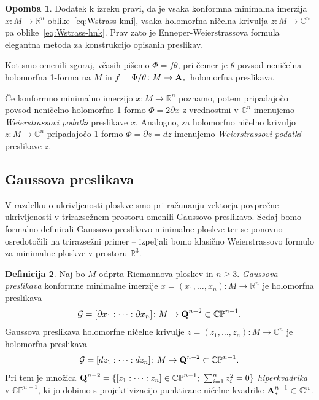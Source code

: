 \documentclass[12pt,a4paper,twoside]{article}
\theoremstyle{definition} %
\newtheorem{definicija}{Definicija}[section]
\newtheorem{opomba}[definicija]{Opomba}
\theoremstyle{plain} %
\numberwithin{equation}{section}  %
\newcommand{\R}{\mathbb R}
\newcommand{\C}{\mathbb C}
\begin{document}
\begin{opomba}
Dodatek k izreku pravi, da je vsaka konformna minimalna imerzija $x \colon M \to \R^{n}$ oblike~\ref{eq:Wstrass-kmi}, vsaka holomorfna ničelna krivulja $z \colon M \to \C^{n}$ pa oblike~\ref{eq:Wstrass-hnk}. Prav zato je Enneper-Weierstrassova formula elegantna metoda za konstrukcijo opisanih preslikav.

Kot smo omenili zgoraj, včasih pišemo $\Phi = f \theta$, pri čemer je $\theta$ povsod neničelna holomorfna 1-forma na $M$ in $f = \Phi / \theta \colon M \to \textbf{\textup{A}}_{*}$ holomorfna preslikava.
\end{opomba}

Če konformno minimalno imerzijo $x \colon M \to \R^{n}$ poznamo, potem pripadajočo povsod neničelno holomorfno 1-formo $\Phi = 2 \partial{x}$ z vrednostmi v $\C^{n}$ imenujemo \emph{Weierstrassovi podatki} preslikave $x$. 
Analogno, za holomorfno ničelno krivuljo $z \colon M \to \C^{n}$ pripadajočo 1-formo $\Phi = \partial{z} = dz$ imenujemo \emph{Weierstrassovi podatki} preslikave $z$.

\subsection{Gaussova preslikava}
%
V razdelku o ukrivljenosti ploskve smo pri računanju vektorja povprečne ukrivljenosti v trirazsežnem prostoru omenili Gaussovo preslikavo. Sedaj bomo formalno definirali Gaussovo preslikavo minimalne ploskve ter se ponovno osredotočili na trirazsežni primer -- izpeljali bomo klasično Weierstrassovo formulo za minimalne ploskve v prostoru $\mathbb{R}^3$.

\begin{definicija}
Naj bo $M$ odprta Riemannova ploskev in $n \geq 3$. \emph{Gaussova preslikava} konformne minimalne imerzije $x = (x_{1}, \dots , x_{n}) \colon M \to \mathbb{R}^{n}$ je holomorfna preslikava
\begin{gather}
\mathcal{G} = [\partial x_{1} : \cdots : \partial x_{n}] \colon M \to \textup{\textbf{Q}}^{n-2} \subset \mathbb{CP}^{n-1}.
\end{gather}
Gaussova preslikava holomorfne ničelne krivulje $z = (z_{1}, \dots , z_{n}) \colon M \to \mathbb{C}^{n}$ je holomorfna preslikava
\begin{gather*}
\mathcal{G} = [dz_{1} : \cdots : dz_{n}] \colon M \to \textup{\textbf{Q}}^{n-2} \subset \mathbb{CP}^{n-1}.
\end{gather*}
Pri tem je množica $\textup{\textbf{Q}}^{n-2} = \{ [z_{1} : \cdots : z_{n}] \in \mathbb{CP}^{n-1} ; \ \sum_{i=1}^{n}z_{i}^2 = 0 \}$ \emph{hiperkvadrika} v $\mathbb{CP}^{n-1}$, ki jo dobimo s projektivizacijo punktirane ničelne kvadrike $\textup{\textbf{A}}_{*}^{n-1} \subset \mathbb{C}^{n}$.
\end{definicija}
\end{document}
